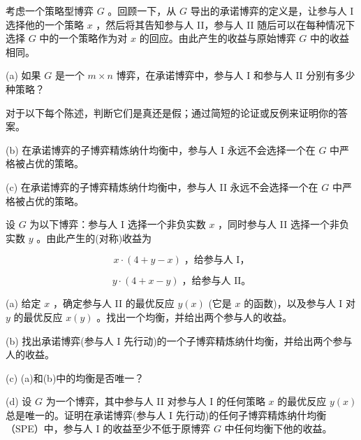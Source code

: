 \begin{exercise}\label{exer:4.6}
考虑一个策略型博弈 \(G\) 。回顾一下，从 \(G\) 导出的承诺博弈的定义是，让参与人 I 选择他的一个策略 \(x\) ，然后将其告知参与人 II，参与人 II 随后可以在每种情况下选择 \(G\) 中的一个策略作为对 \(x\) 的回应。由此产生的收益与原始博弈 \(G\) 中的收益相同。

(a) 如果 \(G\) 是一个 \(m \times  n\) 博弈，在承诺博弈中，参与人 \(\mathrm{I}\) 和参与人 \(\mathrm{{II}}\) 分别有多少种策略？

对于以下每个陈述，判断它们是真还是假；通过简短的论证或反例来证明你的答案。

(b) 在承诺博弈的子博弈精炼纳什均衡中，参与人 I 永远不会选择一个在 \(G\) 中严格被占优的策略。

(c) 在承诺博弈的子博弈精炼纳什均衡中，参与人 II 永远不会选择一个在 \(G\) 中严格被占优的策略。
\end{exercise}

\begin{exercise}\label{exer:4.7}
设 \(G\) 为以下博弈：参与人 I 选择一个非负实数 \(x\) ，同时参与人 II 选择一个非负实数 \(y\) 。由此产生的(对称)收益为

\[
x \cdot  \left( {4 + y - x}\right) \;\text{，给参与人 }\mathrm{I}\text{，}
\]

\[
y \cdot  \left( {4 + x - y}\right) \;\text{，给参与人 II。}
\]

(a) 给定 \(x\) ，确定参与人 II 的最优反应 \(y\left( x\right)\) (它是 \(x\) 的函数)，以及参与人 I 对 \(y\) 的最优反应 \(x\left( y\right)\) 。找出一个均衡，并给出两个参与人的收益。

(b) 找出承诺博弈(参与人 I 先行动)的一个子博弈精炼纳什均衡，并给出两个参与人的收益。

(c) (a)和(b)中的均衡是否唯一？

(d) 设 \(G\) 为一个博弈，其中参与人 II 对参与人 I 的任何策略 \(x\) 的最优反应 \(y\left( x\right)\) 总是唯一的。证明在承诺博弈(参与人 I 先行动)的任何子博弈精炼纳什均衡（SPE）中，参与人 I 的收益至少不低于原博弈 \(G\) 中任何均衡下他的收益。
\end{exercise}

